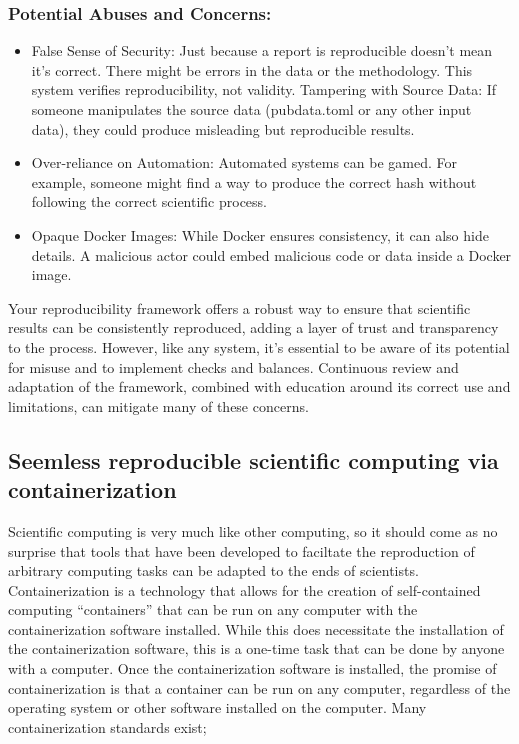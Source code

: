 \hypertarget{potential-abuses-and-concerns}{%
\subsubsection{Potential Abuses and Concerns:}\label{potential-abuses-and-concerns}}

\begin{itemize}
\itemsep -0.2em
\item False Sense of Security: Just because a report is reproducible doesn't mean it's correct. There might be errors in the data or the methodology. This system verifies reproducibility, not validity.
Tampering with Source Data: If someone manipulates the source data (pubdata.toml or any other input data), they could produce misleading but reproducible results.
\item Over-reliance on Automation: Automated systems can be gamed. For example, someone might find a way to produce the correct hash without following the correct scientific process.
\item Opaque Docker Images: While Docker ensures consistency, it can also hide details. A malicious actor could embed malicious code or data inside a Docker image.
\end{itemize}

Your reproducibility framework offers a robust way to ensure that scientific results can be consistently reproduced, adding a layer of trust and transparency to the process. However, like any system, it's essential to be aware of its potential for misuse and to implement checks and balances. Continuous review and adaptation of the framework, combined with education around its correct use and limitations, can mitigate many of these concerns.

\hypertarget{seemless-reproducible-scientific-computing-via-containerization}{%
\subsection{Seemless reproducible scientific computing via containerization}\label{seemless-reproducible-scientific-computing-via-containerization}}

Scientific computing is very much like other computing, so it should come as no surprise that tools that have been developed to faciltate the reproduction of arbitrary computing tasks can be adapted to the ends of scientists. Containerization is a technology that allows for the creation of self-contained computing ``containers'' that can be run on any computer with the containerization software installed. While this does necessitate the installation of the containerization software, this is a one-time task that can be done by anyone with a computer. Once the containerization software is installed, the promise of containerization is that a container can be run on any computer, regardless of the operating system or other software installed on the computer. Many containerization standards exist; 

